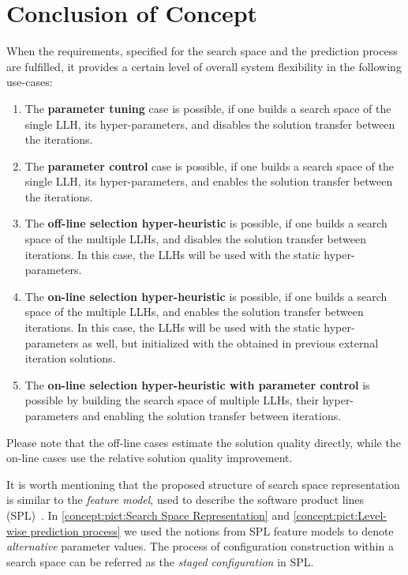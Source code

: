 \section{Conclusion of Concept}\label{concept: conclution}
When the requirements, specified for the search space and the prediction process are fulfilled, it provides a certain level of overall system flexibility in the following use-cases:
\begin{enumerate}
	\item The \textbf{parameter tuning} case is possible, if one builds a search space of the single LLH, its hyper-parameters, and disables the solution transfer between the iterations.
	
	\item The \textbf{parameter control} case is possible, if one builds a search space of the single LLH, its hyper-parameters, and enables the solution transfer between the iterations. 
	
	\item The \textbf{off-line selection hyper-heuristic} is possible, if one builds a search space of the multiple LLHs, and disables the solution transfer between iterations. In this case, the LLHs will be used with the static hyper-parameters.
	
	\item The \textbf{on-line selection hyper-heuristic} is possible, if one builds a search space of the multiple LLHs, and enables the solution transfer between iterations. In this case, the LLHs will be used with the static hyper-parameters as well, but initialized with the obtained in previous external iteration solutions.
	
	\item The \textbf{on-line selection hyper-heuristic with parameter control} is possible by building the search space of multiple LLHs, their hyper-parameters and enabling the solution transfer between iterations.
\end{enumerate}

Please note that the off-line cases estimate the solution quality directly, while the on-line cases use the relative solution quality improvement.

It is worth mentioning that the proposed structure of search space representation is similar to the \emph{feature model}, used to describe the software product lines (SPL)~\cite{schroeter2012multi}. In \cref{concept:pict:Search Space Representation} and \cref{concept:pict:Level-wise prediction process} we used the notions from SPL feature models to denote \emph{alternative} parameter values. The process of configuration construction within a search space can be referred as the \emph{staged configuration} in SPL.